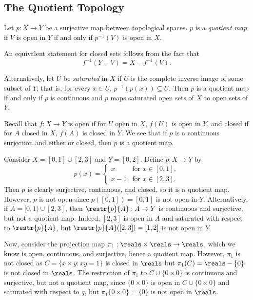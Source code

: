\subsection{The Quotient Topology}
\begin{definition}\label{2.72}
    Let $p: X \rightarrow Y$ be a surjective map between topological spaces. $p$ is a {\it quotient map} if $V$ is open in $Y$ if and only if $p^{-1}(V)$ is open in $X$.
\end{definition}
An equivalent statement for closed sets follows from the fact that
$$f^{-1}(Y-V) = X-f^{-1}(V).$$
\begin{definition}\label{2.73}
    Alternatively, let $U$ be {\it saturated} in $X$ if $U$ is the complete inverse image of some subset of $Y$; that is, for every $x \in U$, $p^{-1}(p(x)) \subseteq U$. Then $p$ is a quotient map if and only if $p$ is continuous and $p$ maps saturated open sets of $X$ to open sets of $Y$.
\end{definition}

Recall that $f: X \rightarrow Y$ is open if for $U$ open in $X$, $f(U)$ is open in $Y$, and closed if for $A$ closed in $X$, $f(A)$ is closed in $Y$. We see that if $p$ is a continuous surjection and either or closed, then $p$ is a quotient map.

Consider $X = [0, 1] \cup [2, 3]$ and $Y = [0, 2]$. Define $p: X \rightarrow Y$ by
$$p(x) = \begin{cases}
    x &\text{for }x \in [0, 1], \\
    x-1 &\text{for }x \in [2, 3].
\end{cases}$$
Then $p$ is clearly surjective, continuous, and closed, so it is a quotient map. However, $p$ is not open since $p([0, 1]) = [0, 1]$ is not open in $Y$. Alternatively, if $A = [0, 1) \cup [2, 3]$, then $\restr{p}{A}: A \rightarrow Y$ is continuous and surjective, but not a quotient map. Indeed, $[2, 3]$ is open in $A$ and saturated with respect to $\restr{p}{A}$, but $\restr{p}{A}([2, 3]) = [1, 2]$ is not open in $Y$.

Now, consider the projection map $\pi_1: \reals \times \reals \rightarrow \reals$, which we know is open, continuous, and surjective, hence a quotient map. However, $\pi_1$ is not closed as $C = \{x\times y: xy = 1\}$ is closed in $\reals$ but $\pi_1(C) = \reals - \{0\}$ is not closed in $\reals$. The restriction of $\pi_1$ to $C \cup \{0 \times 0\}$ is continuous and surjective, but not a quotient map, since $\{0 \times 0\}$ is open in $C \cup \{0 \times 0\}$ and saturated with respect to $q$, but $\pi_1\{0 \times 0\} = \{0\}$ is not open in $\reals$.

